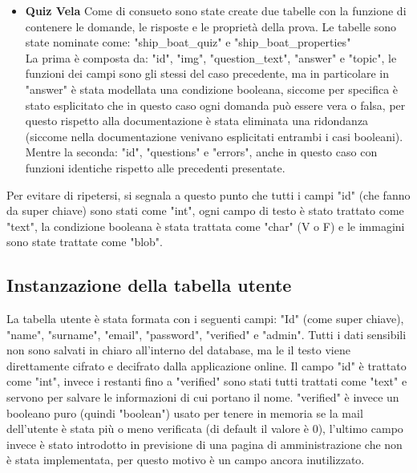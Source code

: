 \begin{itemize}
	\item \textbf{Quiz Vela}
	Come di consueto sono state create due tabelle con la funzione di contenere le domande, le risposte e le proprietà della prova. Le tabelle sono state nominate come: "ship_boat_quiz" e "ship_boat_properties"\\
	La prima è composta da: "id", "img", "question_text", "answer" e "topic", le funzioni dei campi sono gli stessi del caso precedente, ma in particolare in "answer" è stata modellata una condizione booleana, siccome per specifica è stato esplicitato che in questo caso ogni domanda può essere vera o falsa, per questo rispetto alla documentazione è stata eliminata una ridondanza (siccome nella documentazione venivano esplicitati entrambi i casi booleani). Mentre la seconda: "id", "questions" e "errors", anche in questo caso con funzioni identiche rispetto alle precedenti presentate.  
\end{itemize}

Per evitare di ripetersi, si segnala a questo punto che tutti i campi "id" (che fanno da super chiave) sono stati come "int", ogni campo di testo è stato trattato come "text", la condizione booleana è stata trattata come "char" (V o F) e le immagini sono state trattate come "blob". 

\subsection{Instanzazione della tabella utente}
La tabella utente è stata formata con i seguenti campi: "Id" (come super chiave), "name", "surname", "email", "password", "verified" e "admin". Tutti i dati sensibili non sono salvati in chiaro all'interno del database, ma le il testo viene direttamente cifrato e decifrato dalla applicazione online. Il campo "id" è trattato come "int", invece i restanti fino a "verified" sono stati tutti trattati come "text" e servono per salvare le informazioni di cui portano il nome. "verified" è invece un booleano puro (quindi "boolean") usato per tenere in memoria se la mail dell'utente è stata più o meno verificata (di default il valore è 0), l'ultimo campo invece è stato introdotto in previsione di una pagina di amministrazione che non è stata implementata, per questo motivo è un campo ancora inutilizzato. 